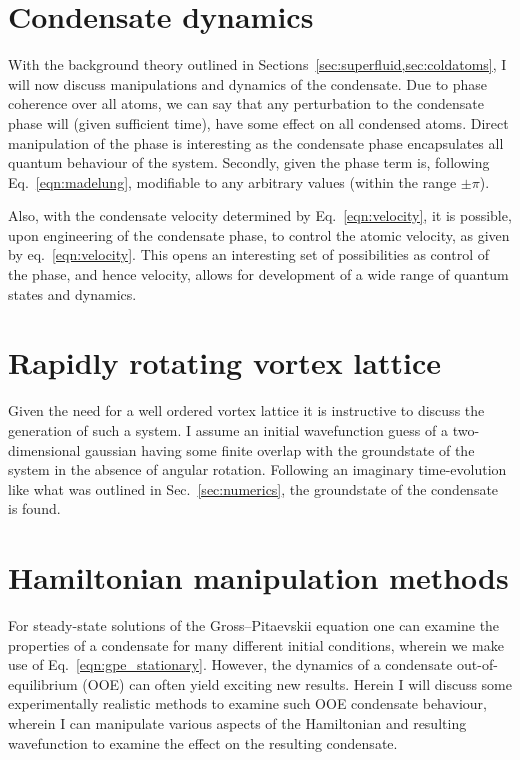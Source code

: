 \section{Condensate dynamics}
With the background theory outlined in Sections~\ref{sec:superfluid,sec:coldatoms}, I will now discuss manipulations and dynamics of the condensate. Due to phase coherence over all atoms, we can say that any perturbation to the condensate phase will (given sufficient time), have some effect on all condensed atoms. Direct manipulation of the phase is interesting as the condensate phase encapsulates all quantum behaviour of the system. Secondly, given the phase term is, following Eq.~\ref{eqn:madelung}, modifiable to any arbitrary values (within the range $\pm \pi$).

Also, with the condensate velocity determined by Eq.~\ref{eqn:velocity}, it is possible, upon engineering of the condensate phase, to control the atomic velocity, as given by eq.~\ref{eqn:velocity}. This opens an interesting set of possibilities as control of the phase, and hence velocity, allows for development of a wide range of quantum states and dynamics.





\section{Rapidly rotating vortex lattice}
Given the need for a well ordered vortex lattice it is instructive to discuss the generation of such a system. I assume an initial wavefunction guess of a two-dimensional gaussian having some finite overlap with the groundstate of the system in the absence of angular rotation. Following an imaginary time-evolution like what was outlined in Sec.~\ref{sec:numerics}, the groundstate of the condensate is found.

\section{Hamiltonian manipulation methods}
For steady-state solutions of the Gross--Pitaevskii equation one can examine the properties of a condensate for many different initial conditions, wherein we make use of Eq.~\ref{eqn:gpe_stationary}. However, the dynamics of a condensate out-of-equilibrium (OOE) can often yield exciting new results. Herein I will discuss some experimentally realistic methods to examine such OOE condensate behaviour, wherein I can manipulate various aspects of the Hamiltonian and resulting wavefunction to examine the effect on the resulting condensate.

